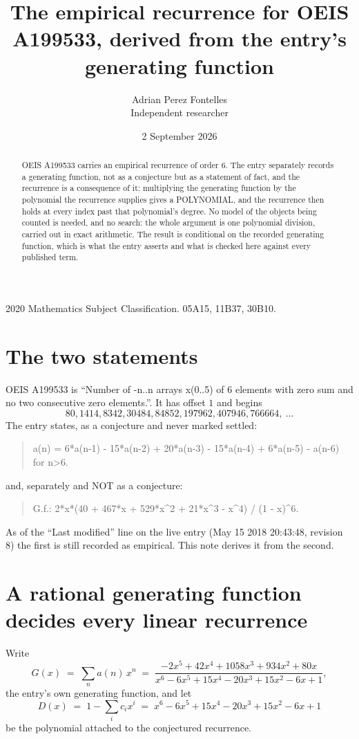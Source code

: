 \documentclass[11pt,a4paper]{article}
\title{The empirical recurrence for OEIS A199533, derived from the entry's generating function}
\author{Adrian Perez Fontelles\\ \small Independent researcher}
\date{2 September 2026}
\theoremstyle{plain}
\theoremstyle{definition}
\begin{document}
\maketitle

\begin{abstract}
OEIS A199533 carries an empirical recurrence of order $6$. The entry separately records a
generating function, not as a conjecture but as a statement of fact, and the recurrence is a
consequence of it: multiplying the generating function by the polynomial the recurrence
supplies gives a POLYNOMIAL, and the recurrence then holds at every index past that
polynomial's degree. No model of the objects being counted is needed, and no search: the
whole argument is one polynomial division, carried out in exact arithmetic. The result is
conditional on the recorded generating function, which is what the entry asserts and what is
checked here against every published term.
\end{abstract}

\noindent\small 2020 Mathematics Subject Classification. 05A15, 11B37, 30B10.\normalsize

\section{The two statements}

OEIS A199533 is ``Number of -n..n arrays x(0..5) of 6 elements with zero sum and no two consecutive zero elements.''. It has offset $1$ and begins
\[
80, 1414, 8342, 30484, 84852, 197962, 407946, 766664,\ \dots
\]
The entry states, as a conjecture and never marked settled:
\begin{quote}
a(n) = 6*a(n-1) - 15*a(n-2) + 20*a(n-3) - 15*a(n-4) + 6*a(n-5) - a(n-6) for n>6.
\end{quote}
and, separately and NOT as a conjecture:
\begin{quote}
G.f.: 2*x*(40 + 467*x + 529*x\^{}2 + 21*x\^{}3 - x\^{}4) / (1 - x)\^{}6.
\end{quote}
As of the ``Last modified'' line on the live entry (May 15 2018 20:43:48, revision 8) the first is still
recorded as empirical. This note derives it from the second.

\section{A rational generating function decides every linear recurrence}

Write
\[
G(x)\;=\;\sum_{n}a(n)\,x^{n}\;=\;\frac{- 2 x^{5} + 42 x^{4} + 1058 x^{3} + 934 x^{2} + 80 x}{x^{6} - 6 x^{5} + 15 x^{4} - 20 x^{3} + 15 x^{2} - 6 x + 1},
\]
the entry's own generating function, and let
\[
D(x)\;=\;1-\sum_i c_i x^{i}\;=\;x^{6} - 6 x^{5} + 15 x^{4} - 20 x^{3} + 15 x^{2} - 6 x + 1
\]
be the polynomial attached to the conjectured recurrence.
\end{document}

